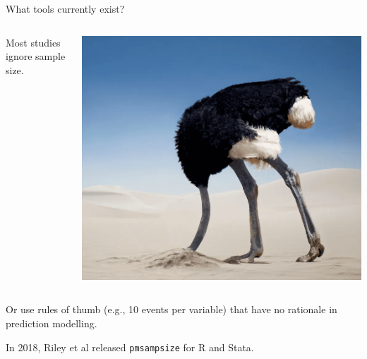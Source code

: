 \documentclass[11pt]{beamer}
\begin{document}
\begin{frame}[t]{What tools currently exist?}

	\centering
	\begin{columns}
		\begin{column}[c]{0.6\textwidth}
			\centering
			Most studies ignore sample size.
		\end{column}
		\begin{column}[c]{0.35\textwidth}
			\includegraphics[width=\textwidth]{figures/bury-head.png}
		\end{column}
	\end{columns}

	\vspace{3em}

	Or use rules of thumb (e.g., 10 events per variable) that have no
	rationale in prediction modelling\autocite{vansmeden2016}.


	\vspace{3em}
	In 2018, Riley et al released \texttt{pmsampsize} for R and Stata.

\end{frame}
\end{document}
